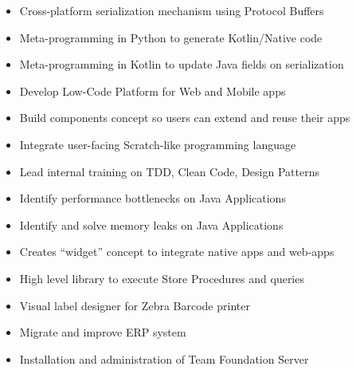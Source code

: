 \documentclass[10pt,letterpaper,ragged2d,withhyper]{altacv}
\begin{document}
\begin{paracol}{2}
\begin{itemize}
\item Cross-platform serialization mechanism using Protocol Buffers
\item Meta-programming in Python to generate Kotlin/Native code
\item Meta-programming in Kotlin to update Java fields on serialization
\item Develop Low-Code Platform for Web and Mobile apps
\item Build components concept so users can extend and reuse their apps
\item Integrate user-facing Scratch-like programming language
\item Lead internal training on TDD, Clean Code, Design Patterns
\item Identify performance bottlenecks on Java Applications
\item Identify and solve memory leaks on Java Applications
\item Creates ``widget'' concept to integrate native apps and web-apps
\end{itemize}


\divider

\begin{itemize}
\item High level library to execute Store Procedures and queries
\item Visual label designer for Zebra Barcode printer
\item Migrate and improve ERP system
\item Installation and administration of Team Foundation Server
\end{itemize}


\end{paracol}
\end{document}

